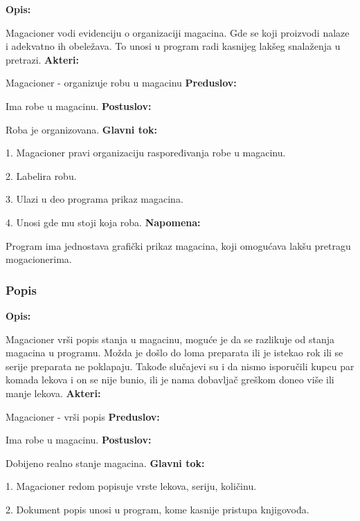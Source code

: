 \textbf{Opis:}

Magacioner vodi evidenciju o organizaciji magacina. Gde se koji proizvodi nalaze i adekvatno ih obeležava. To unosi u program radi kasnijeg lakšeg snalaženja u pretrazi.
\newline
\textbf{Akteri:}

Magacioner - organizuje robu u magacinu
\newline
\textbf{Preduslov:}

Ima robe u magacinu.
\newline
\textbf{Postuslov:}

Roba je organizovana.
\newline
\textbf{Glavni tok:}

1. Magacioner pravi organizaciju raspoređivanja robe u magacinu.

2. Labelira robu.

3. Ulazi u deo programa prikaz magacina.

4. Unosi gde mu stoji koja roba.
\newline
\textbf{Napomena:}

Program ima jednostava grafički prikaz magacina, koji omogućava lakšu pretragu mogacionerima.

\subsubsection{Popis}

\textbf{Opis:}

Magacioner vrši popis stanja u magacinu, moguće je da se razlikuje od stanja magacina u programu. Možda je došlo do loma preparata ili je istekao rok ili se serije preparata ne poklapaju. Takođe slučajevi su i da nismo isporučili kupcu par komada lekova i on se nije bunio, ili je nama dobavljač greškom doneo više ili manje lekova.
\newline
\textbf{Akteri:}

Magacioner - vrši popis
\newline
\textbf{Preduslov:}

Ima robe u magacinu.
\newline
\textbf{Postuslov:}

Dobijeno realno stanje magacina.
\newline
\textbf{Glavni tok:}

1. Magacioner redom popisuje vrste lekova, seriju, količinu.

2. Dokument popis unosi u program, kome kasnije pristupa knjigovođa.

